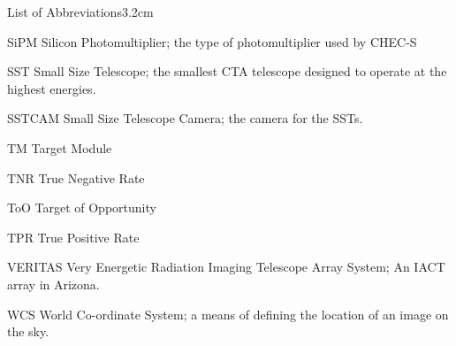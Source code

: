 \begin{mclistof}{List of Abbreviations}{3.2cm}
\item[SiPM] Silicon Photomultiplier; the type of photomultiplier used by CHEC-S
\item[SST] Small Size Telescope; the smallest CTA telescope designed to operate at the highest energies.
\item[SSTCAM] Small Size Telescope Camera; the camera for the SSTs.
\item[TM] Target Module
\item[TNR] True Negative Rate
\item[ToO] Target of Opportunity
\item[TPR] True Positive Rate
\item[VERITAS] Very Energetic Radiation Imaging Telescope Array System; An IACT array in Arizona.
\item[WCS] World Co-ordinate System; a means of defining the location of an image on the sky.
\end{mclistof} 
